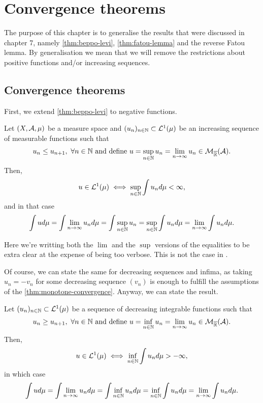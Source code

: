 
\chapter{Convergence theorems}

The purpose of this chapter is to generalise the results that were discussed in chapter 7, namely \autoref{thm:beppo-levi}, \autoref{thm:fatou-lemma} and the reverse Fatou lemma. By generalisation we mean that we will remove the restrictions about positive functions and/or increasing sequences.

\section{Convergence theorems}

First, we extend \autoref{thm:beppo-levi} to negative functions.
\begin{thm}
	\label{thm:monotone-convergence}
	Let $(X, \mathcal{A}, \mu)$ be a measure space and $(u_n)_{n\in\mathbb{N}} \subset \mathcal{L}^1(\mu)$ be an increasing sequence of measurable functions such that
	\begin{align*}
		u_n \leq u_{n+1},\ \forall n \in \mathbb{N}\text{ and define } u = \sup_{n\in \mathbb{N}} u_n = \lim_{n \to \infty} u_n \in \mathcal{M}_{\overline{\mathbb{R}}}(\mathcal{A}).
	\end{align*}
	Then,
	\begin{align}
		u \in \mathcal{L}^1(\mu) \iff \sup_{n\in\mathbb{N}} \int u_n d\mu < \infty,
	\end{align}
	and in that case
	\begin{align}
		\int u d\mu = \int \lim_{n \to \infty} u_n d\mu = \int \sup_{n\in\mathbb{N}} u_n = \sup_{n\in\mathbb{N}} \int u_n d\mu = \lim_{n \to \infty} \int u_n d\mu.
	\end{align}
\end{thm}

Here we're writting both the $\lim$ and the $\sup$ versions of the equalities to be extra clear at the expense of being too verbose. This is not the case in \cite[p- 88]{schilling2017}.

Of course, we can state the same for decreasing sequences and infima, as taking $u_n = - v_n$ for some decreasing sequence $(v_n)$ is enough to fulfill the assumptions of the \autoref{thm:monotone-convergence}. Anyway, we can state the result.

\begin{cor}
	Let $(u_n)_{n\in\mathbb{N}} \subset \mathcal{L}^1(\mu)$ be a sequence of decreasing integrable functions such that
	\begin{align*}
	u_n \geq u_{n+1},\ \forall n \in \mathbb{N}\text{ and define } u = \inf_{n\in\mathbb{N}} u_n = \lim_{n \to \infty} u_n \in \mathcal{M}_{\overline{\mathbb{R}}}(\mathcal{A}).
	\end{align*}
	Then,
	\begin{align}
	u \in \mathcal{L}^1(\mu) \iff \inf_{n\in\mathbb{N}} \int u_n d\mu > -\infty,
	\end{align}
	in which case
	\begin{align}
	\int u d\mu = \int \lim_{n \to \infty} u_n d\mu = \int \inf_{n\in\mathbb{N}} u_n d\mu = \inf_{n\in\mathbb{N}} \int u_n d\mu = \lim_{n \to \infty} \int u_n d\mu.
	\end{align}
\end{cor}

